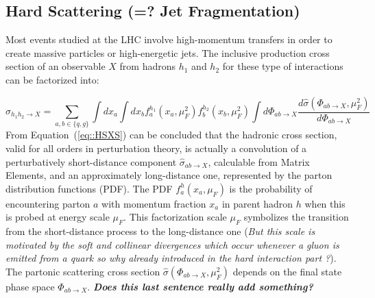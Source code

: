 \subsection{Hard Scattering (=? Jet Fragmentation)} \label{sec::HardScattering}
Most events studied at the LHC involve high-momentum transfers in order to create massive particles or high-energetic jets. The inclusive production cross section of an observable $X$ from hadrons $h_1$ and $h_2$ for these type of interactions can be factorized into:

\begin{equation} \label{eq::HSXS}
 \sigma_{h_{1}h_{2} \rightarrow X} =\sum_{a,b \in \{q,g\} } \int dx_{a} \int dx_{b} f_{a}^{h_{1}}(x_{a},\mu^{2}_{F}) f_{b}^{h_{2}}(x_{b},\mu^{2}_{F}) \int d\Phi_{ab \rightarrow X} \dfrac{d\hat{\sigma}(\Phi_{ab \rightarrow X},\mu^{2}_{F})}{d\Phi_{ab \rightarrow X}}
\end{equation}
From Equation~(\ref{eq::HSXS}) can be concluded that the hadronic cross section, valid for all orders in perturbation theory, is actually a convolution of a perturbatively short-distance component $\hat{\sigma}_{ab \rightarrow X}$, calculable from Matrix Elements, and an approximately long-distance one, represented by the parton distribution functions (PDF). The PDF $f_{a}^{h}(x_{a},\mu_{F})$ is the probability of encountering parton $a$ with momentum fraction $x_a$ in parent hadron $h$ when this is probed at energy scale $\mu_{F}$. This factorization scale $\mu_{F}$ symbolizes the transition from the short-distance process to the long-distance one (\textit{But this scale is motivated by the soft and collinear divergences which occur whenever a gluon is emitted from a quark so why already introduced in the hard interaction part ?}). 
The partonic scattering cross section $\hat{\sigma}(\Phi_{ab \rightarrow X},\mu^{2}_{F})$ depends on the final state phase space $\Phi_{ab \rightarrow X}$. 
\textit{\textbf{Does this last sentence really add something?}}\\

